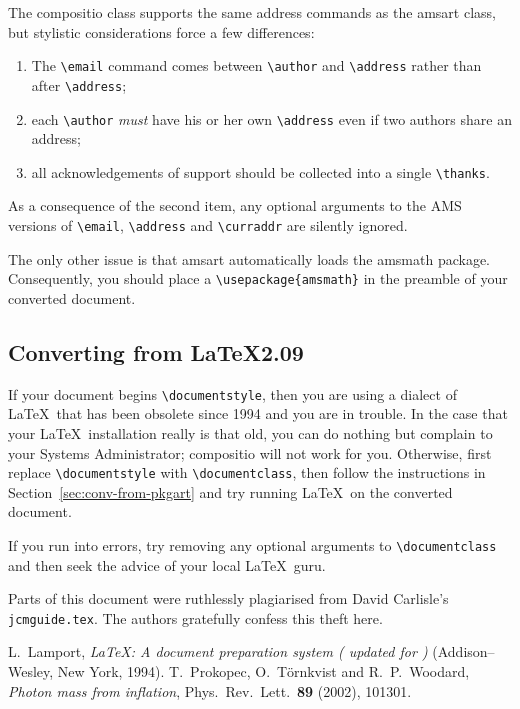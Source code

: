 \documentclass[noams]{compositio}
\newcommand*{\pkg}[1]{{\mdseries\textsf{#1}}}
\begin{document}
The \pkg{compositio} class supports the same address commands as
the \pkg{amsart} class, but stylistic considerations force a few
differences:
\begin{enumerate}
\item The \verb+\email+ command comes between \verb+\author+ and
\verb+\address+ rather than after \verb+\address+; \item each
\verb+\author+ \emph{must} have his or her own \verb+\address+
even if two authors share an address; \item all acknowledgements
of support should be collected into a single \verb+\thanks+.
\end{enumerate}
As a consequence of the second item, any optional arguments to the
AMS versions of \verb+\email+, \verb+\address+ and
\verb+\curraddr+ are silently ignored.

The only other issue is that \pkg{amsart} automatically loads the
\pkg{amsmath} package.  Consequently, you should place a
\verb+\usepackage{amsmath}+ in the preamble of your converted
document.

\subsection{Converting from \LaTeX2.09}
\label{sec:conv-from-latex209}

If your document begins \verb+\documentstyle+, then you are using
a dialect of \LaTeX\ that has been obsolete since 1994 and you are
in trouble. In the case that your \LaTeX\ installation really is
that old, you can do nothing but complain to your Systems
Administrator; \pkg{compositio} will not work for you. Otherwise,
first replace \verb+\documentstyle+ with \verb+\documentclass+, then
follow the instructions in Section~\ref{sec:conv-from-pkgart} and
try running \LaTeX\ on the converted document.

If you run into errors, try removing any optional arguments to
\verb+\documentclass+ and then seek the advice of your local \LaTeX\
guru.

\begin{acknowledgements}
Parts of this document were ruthlessly plagiarised from David
Carlisle's \texttt{jcmguide.tex}.  The authors gratefully confess
this theft here.
\end{acknowledgements}

\begin{thebibliography}{PTW02} %
\bibitem[Lam94]{Lamport}
  L.~Lamport, \emph{\LaTeX: A document preparation system \textup{(}%
  updated for \LaTeXe\textup{)}} (Addison--Wesley, New York, 1994).
\bibitem[PTW02]{PRL}
  T.~Prokopec, O.~T\"ornkvist and R.~P.~Woodard, \emph{Photon mass
  from inflation}, Phys.\ Rev.\ Lett.\ \textbf{89} (2002), 101301.
\end{thebibliography}
\end{document}
